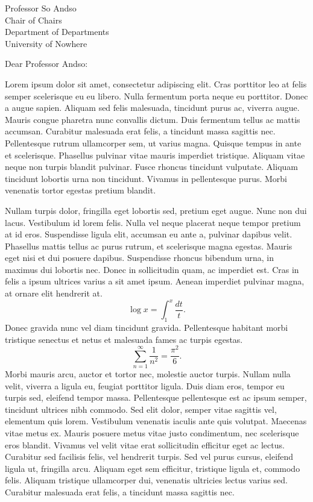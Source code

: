 \documentclass[letterpaper]{mscsletter}
\begin{document}
\begin{letter}{
Professor So Andso\\
Chair of Chairs\\
Department of Departments\\
University of Nowhere\\
}

\opening{Dear Professor Andso:}

Lorem ipsum dolor sit amet, consectetur adipiscing elit. Cras
porttitor leo at felis semper scelerisque eu eu libero. Nulla
fermentum porta neque eu porttitor. Donec a augue sapien. Aliquam sed
felis malesuada, tincidunt purus ac, viverra augue. Mauris congue
pharetra nunc convallis dictum. Duis fermentum tellus ac mattis
accumsan. Curabitur malesuada erat felis, a tincidunt massa sagittis
nec. Pellentesque rutrum ullamcorper sem, ut varius magna. Quisque
tempus in ante et scelerisque. Phasellus pulvinar vitae mauris
imperdiet tristique. Aliquam vitae neque non turpis blandit
pulvinar. Fusce rhoncus tincidunt vulputate. Aliquam tincidunt
lobortis urna non tincidunt. Vivamus in pellentesque purus. Morbi
venenatis tortor egestas pretium blandit.

Nullam turpis dolor, fringilla eget lobortis sed, pretium eget
augue. Nunc non dui lacus. Vestibulum id lorem felis. Nulla vel neque
placerat neque tempor pretium at id eros. Suspendisse ligula elit,
accumsan eu ante a, pulvinar dapibus velit. Phasellus mattis tellus ac
purus rutrum, et scelerisque magna egestas. Mauris eget nisi et dui
posuere dapibus. Suspendisse rhoncus bibendum urna, in maximus dui
lobortis nec. Donec in sollicitudin quam, ac imperdiet est. Cras in
felis a ipsum ultrices varius a sit amet ipsum. Aenean imperdiet
pulvinar magna, at ornare elit hendrerit at.
$$\log x = \int_1^x\frac{dt}{t}.$$
Donec gravida nunc vel diam tincidunt gravida. Pellentesque habitant
morbi tristique senectus et netus et malesuada fames ac turpis
egestas.
$$\sum_{n=1}^\infty\frac{1}{n^2} = \frac{\pi^2}{6}.$$
Morbi mauris arcu, auctor et tortor nec, molestie auctor
turpis. Nullam nulla velit, viverra a ligula eu, feugiat porttitor
ligula. Duis diam eros, tempor eu turpis sed, eleifend tempor
massa. Pellentesque pellentesque est ac ipsum semper, tincidunt
ultrices nibh commodo. Sed elit dolor, semper vitae sagittis vel,
elementum quis lorem. Vestibulum venenatis iaculis ante quis
volutpat. Maecenas vitae metus ex. Mauris posuere metus vitae justo
condimentum, nec scelerisque eros blandit. Vivamus vel velit vitae
erat sollicitudin efficitur eget ac lectus. Curabitur sed facilisis
felis, vel hendrerit turpis. Sed vel purus cursus, eleifend ligula ut,
fringilla arcu. Aliquam eget sem efficitur, tristique ligula et,
commodo felis. Aliquam tristique ullamcorper dui, venenatis ultricies
lectus varius sed. Curabitur malesuada erat felis, a tincidunt massa sagittis
nec.


\end{letter}
\end{document}
